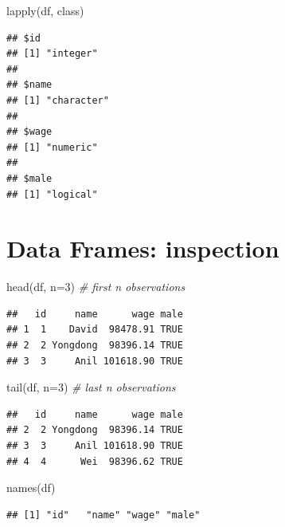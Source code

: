 \documentclass[
  11pt,
]{book}
\newenvironment{Shaded}{\begin{snugshade}}{\end{snugshade}}
\newcommand{\AttributeTok}[1]{\textcolor[rgb]{0.77,0.63,0.00}{#1}}
\newcommand{\CommentTok}[1]{\textcolor[rgb]{0.56,0.35,0.01}{\textit{#1}}}
\newcommand{\DecValTok}[1]{\textcolor[rgb]{0.00,0.00,0.81}{#1}}
\newcommand{\FunctionTok}[1]{\textcolor[rgb]{0.00,0.00,0.00}{#1}}
\newcommand{\NormalTok}[1]{#1}
\begin{document}
\begin{Shaded}
\begin{Highlighting}[]
\FunctionTok{lapply}\NormalTok{(df, class)}
\end{Highlighting}
\end{Shaded}

\begin{verbatim}
## $id
## [1] "integer"
## 
## $name
## [1] "character"
## 
## $wage
## [1] "numeric"
## 
## $male
## [1] "logical"
\end{verbatim}

\hypertarget{data-frames-inspection}{%
\section{Data Frames: inspection}\label{data-frames-inspection}}

\begin{Shaded}
\begin{Highlighting}[]
\FunctionTok{head}\NormalTok{(df, }\AttributeTok{n=}\DecValTok{3}\NormalTok{) }\CommentTok{\# first n observations}
\end{Highlighting}
\end{Shaded}

\begin{verbatim}
##   id     name      wage male
## 1  1    David  98478.91 TRUE
## 2  2 Yongdong  98396.14 TRUE
## 3  3     Anil 101618.90 TRUE
\end{verbatim}

\begin{Shaded}
\begin{Highlighting}[]
\FunctionTok{tail}\NormalTok{(df, }\AttributeTok{n=}\DecValTok{3}\NormalTok{) }\CommentTok{\# last n observations}
\end{Highlighting}
\end{Shaded}

\begin{verbatim}
##   id     name      wage male
## 2  2 Yongdong  98396.14 TRUE
## 3  3     Anil 101618.90 TRUE
## 4  4      Wei  98396.62 TRUE
\end{verbatim}

\begin{Shaded}
\begin{Highlighting}[]
\FunctionTok{names}\NormalTok{(df)}
\end{Highlighting}
\end{Shaded}

\begin{verbatim}
## [1] "id"   "name" "wage" "male"
\end{verbatim}
\end{document}
